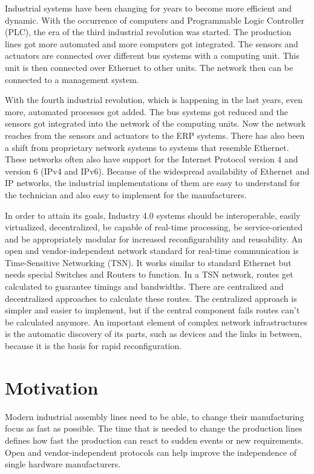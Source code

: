 Industrial systems have been changing for years to become more efficient and dynamic. With the occurrence of computers and Programmable Logic Controller (PLC), the era of the third industrial revolution was started. The production lines got more automated and more computers got integrated. The sensors and actuators are connected over different bus systems with a computing unit. This unit is then connected over Ethernet to other units. The network then can be connected to a management system.

With the fourth industrial revolution, which is happening in the last years, even more, automated processes got added. The bus systems got reduced and the sensors got integrated into the network of the computing units. Now the network reaches from the sensors and actuators to the ERP systems. There has also been a shift from proprietary network systems to systems that resemble Ethernet. These networks often also have support for the Internet Protocol version 4 and version 6 (IPv4 and IPv6). Because of the widespread availability of Ethernet and IP networks, the industrial implementations of them are easy to understand for the technician and also easy to implement for the manufacturers.

In order to attain its goals, Industry 4.0 systems should be interoperable, easily virtualized, decentralized, be capable of real-time processing, be service-oriented and be appropriately modular for increased reconfigurability and reusability. An open and vendor-independent network standard for real-time communication is Time-Sensitive Networking (TSN). It works similar to standard Ethernet but needs special Switches and Routers to function. In a TSN network, routes get calculated to guarantee timings and bandwidths. There are centralized and decentralized approaches to calculate these routes. The centralized approach is simpler and easier to implement, but if the central component fails routes can't be calculated anymore. An important element of complex network infrastructures is the automatic discovery of its parts, such as devices and the links in between, because it is the basis for rapid reconfiguration. \cite{IEEE:IND4:2019}

\section{Motivation}
Modern industrial assembly lines need to be able, to change their manufacturing focus as fast as possible. The time that is needed to change the production lines defines how fast the production can react to sudden events or new requirements. Open and vendor-independent protocols can help improve the independence of single hardware manufacturers.

